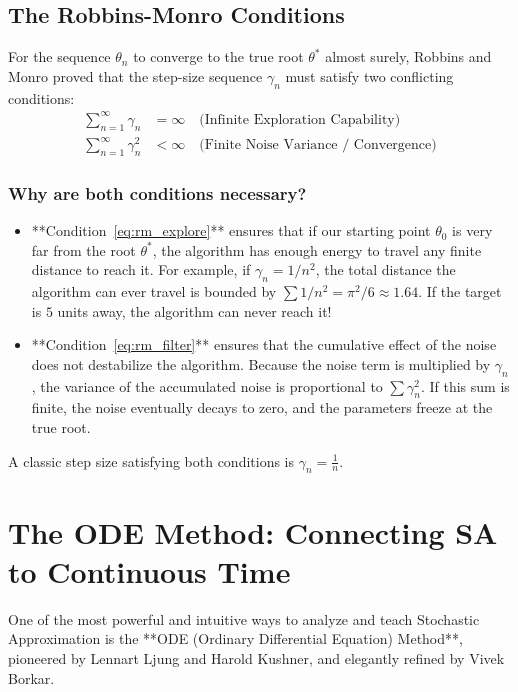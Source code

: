 \documentclass[11pt]{article}
\begin{document}
\subsection{The Robbins-Monro Conditions}
For the sequence $\theta_n$ to converge to the true root $\theta^*$ almost surely, Robbins and Monro proved that the step-size sequence $\gamma_n$ must satisfy two conflicting conditions:
\begin{align}
    \sum_{n=1}^\infty \gamma_n &= \infty \quad \text{(Infinite Exploration Capability)} \label{eq:rm_explore} \\
    \sum_{n=1}^\infty \gamma_n^2 &< \infty \quad \text{(Finite Noise Variance / Convergence)} \label{eq:rm_filter}
\end{align}

\subsubsection*{Why are both conditions necessary?}
\begin{itemize}
    \item **Condition~\eqref{eq:rm_explore}** ensures that if our starting point $\theta_0$ is very far from the root $\theta^*$, the algorithm has enough energy to travel any finite distance to reach it. For example, if $\gamma_n = 1/n^2$, the total distance the algorithm can ever travel is bounded by $\sum 1/n^2 = \pi^2/6 \approx 1.64$. If the target is $5$ units away, the algorithm can never reach it!
    \item **Condition~\eqref{eq:rm_filter}** ensures that the cumulative effect of the noise does not destabilize the algorithm. Because the noise term is multiplied by $\gamma_n$, the variance of the accumulated noise is proportional to $\sum \gamma_n^2$. If this sum is finite, the noise eventually decays to zero, and the parameters freeze at the true root.
\end{itemize}
A classic step size satisfying both conditions is $\gamma_n = \frac{1}{n}$.

\section{The ODE Method: Connecting SA to Continuous Time}

One of the most powerful and intuitive ways to analyze and teach Stochastic Approximation is the **ODE (Ordinary Differential Equation) Method**, pioneered by Lennart Ljung and Harold Kushner, and elegantly refined by Vivek Borkar.
\end{document}
